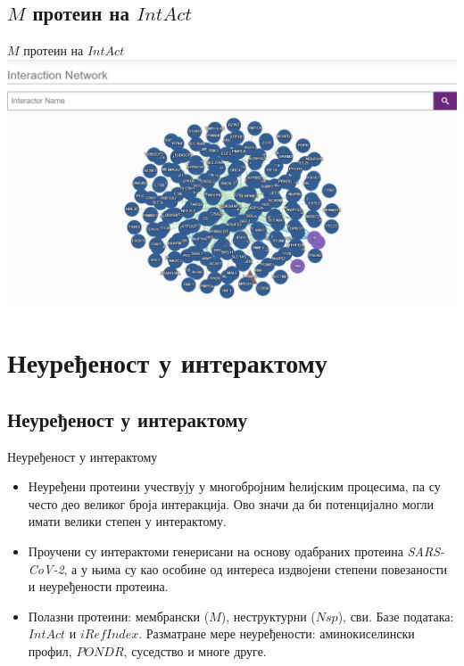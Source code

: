 \documentclass[hyperref={bookmarks=false}]{beamer}
\begin{document}
\subsection{$M$ протеин на $IntAct$}
\begin{frame}{$M$ протеин на $IntAct$}
\centering\includegraphics[width=\textwidth]{IntAct.png}
\end{frame}

\section{Неуређеност у интерактому}
\subsection{Неуређеност у интерактому}
\begin{frame}{Неуређеност у интерактому}
\begin{itemize}
	\item Неуређени протеини учествују у многобројним ћелијским процесима, па су често део великог броја интеракција. Ово значи да би потенцијално могли имати велики степен у интерактому.

	\item Проучени су интерактоми генерисани на основу одабраних протеина \textit{SARS-CoV-2}, а у њима су као особине од интереса издвојени степени повезаности и неуређености протеина.

	\item Полазни протеини: мембрански ($M$), неструктурни ($Nsp$), сви. Базе података: $IntAct$ и $iRefIndex$. Разматране мере неуређености: аминокиселински профил, $PONDR$, суседство и многе друге.
\end{itemize}
\end{frame}
\end{document}
